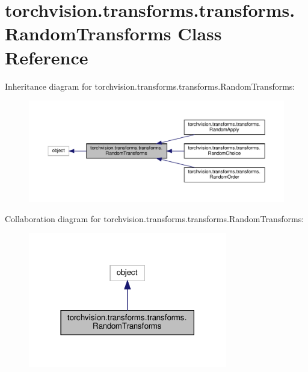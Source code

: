 \hypertarget{classtorchvision_1_1transforms_1_1transforms_1_1RandomTransforms}{}\section{torchvision.\+transforms.\+transforms.\+Random\+Transforms Class Reference}
\label{classtorchvision_1_1transforms_1_1transforms_1_1RandomTransforms}


Inheritance diagram for torchvision.\+transforms.\+transforms.\+Random\+Transforms\+:
\nopagebreak
\begin{figure}[H]
\begin{center}
\leavevmode
\includegraphics[width=350pt]{classtorchvision_1_1transforms_1_1transforms_1_1RandomTransforms__inherit__graph}
\end{center}
\end{figure}


Collaboration diagram for torchvision.\+transforms.\+transforms.\+Random\+Transforms\+:
\nopagebreak
\begin{figure}[H]
\begin{center}
\leavevmode
\includegraphics[width=246pt]{classtorchvision_1_1transforms_1_1transforms_1_1RandomTransforms__coll__graph}
\end{center}
\end{figure}
